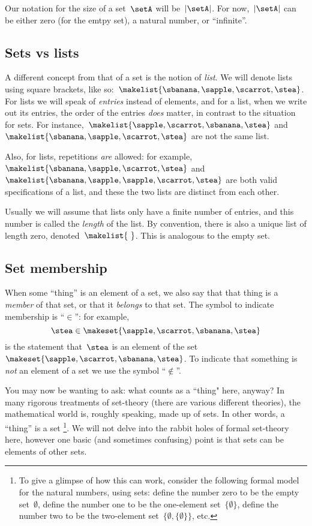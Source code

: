 Our notation for the size of a set~$\setA$ will be~$\vert \setA \vert$.
For now,~$\vert \setA \vert$ can be either zero (for the emtpy set), a natural number, or ``infinite''.

\subsection{Sets vs lists}

A different concept from that of a set is the notion of \emph{list}.
We will denote lists using square brackets, like so:~$\makelist{\sbanana, \sapple, \scarrot, \stea}$.
For lists we will speak of \emph{entries} instead of elements, and for a list, when we write out its entries, the order of the entries \emph{does} matter, in contrast to the situation for sets.
For instance,~$\makelist{\sapple, \scarrot, \sbanana, \stea}$ and~$\makelist{\sbanana, \sapple, \scarrot, \stea}$ are not the same list.

Also, for lists, repetitions \emph{are} allowed: for example,~$\makelist{\sbanana, \sapple, \scarrot, \stea}$ and~$\makelist{\sbanana, \sapple, \sapple, \scarrot, \stea}$ are both valid specifications of a list, and these the two lists are distinct from each other.

Usually we will assume that lists only have a finite number of entries, and this number is called the \emph{length} of the list.
By convention, there is also a unique list of length zero, denoted~$\makelist{\ }$.
This is analogous to the empty set.

\subsection{Set membership}

When some ``thing'' is an element of a set, we also say that that thing is a \emph{member} of that set, or that it \emph{belongs} to that set.
The symbol to indicate membership is ``$\in$'': for example,
\begin{equation*}
    \stea \in \makeset{ \sapple, \scarrot, \sbanana, \stea }
\end{equation*}
is the statement that~$\stea$ is an element of the set~$\makeset{ \sapple, \scarrot, \sbanana, \stea }$.
To indicate that something is \emph{not} an element of a set we use the symbol ``$\notin$''.

You may now be wanting to ask: what counts as a ``thing" here, anyway?
In many rigorous treatments of set-theory (there are various different theories), the mathematical world is, roughly speaking, made up of sets.
In other words, a ``thing'' is a set
\footnote{To give a glimpse of how this can work, consider the following formal model for the natural numbers, using sets: define the number zero to be the empty set~$\emptyset$, define the number one to be the one-element set~$\{ \emptyset \}$, define the number two to be the two-element set~$\{ \emptyset, \{ \emptyset \} \}$, etc. }.
We will not delve into the rabbit holes of formal set-theory here, however one basic (and sometimes confusing) point is that sets can be elements of other sets.

